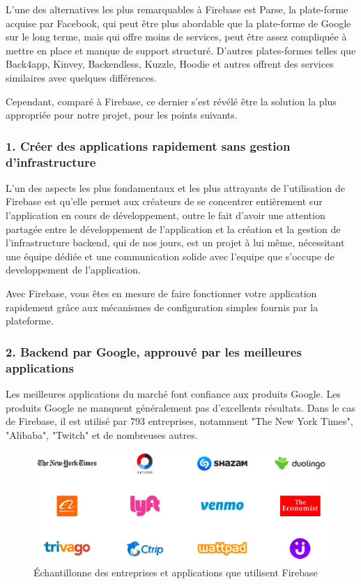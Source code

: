 L’une des alternatives les plus remarquables à Firebase est Parse, la plate-forme acquise par Facebook, qui peut être plus abordable que la plate-forme de Google sur le long terme, mais qui offre moins de services, peut être assez compliquée à mettre en place et manque de support structuré. D'autres plates-formes telles que Back4app, Kinvey, Backendless, Kuzzle, Hoodie et autres offrent des services similaires avec quelques différences.

Cependant, comparé à Firebase, ce dernier s’est révélé être la solution la plus appropriée pour notre projet, pour les points suivants.

\subsubsection{1. Créer des applications rapidement sans gestion d'infrastructure}
L’un des aspects les plus fondamentaux et les plus attrayants de l’utilisation de Firebase est qu’elle permet aux créateurs de se concentrer entièrement sur l’application en cours de développement, outre le fait d’avoir une attention partagée entre le développement de l’application et la création et la gestion de l’infrastructure backend, qui de nos jours, est un projet à lui même, nécessitant une équipe dédiée et une communication solide avec l'equipe que s'occupe de developpement de l'application.

Avec Firebase, vous êtes en mesure de faire fonctionner votre application rapidement grâce aux mécanismes de configuration simples fournis par la plateforme.

\subsubsection{2. Backend par Google, approuvé par les meilleures applications}
Les meilleures applications du marché font confiance aux produits Google. Les produits Google ne manquent généralement pas d'excellents résultats. Dans le cas de Firebase, il est utilisé par 793 entreprises\cite{noauthor_companies_nodate}, notamment "The New York Times", "Alibaba", "Twitch" et de nombreuses autres.\bigskip

\begin{figure}[h]
	\begin{center}
		\includegraphics[width=13cm]{Images/chapter2/trusting_apps.png}
		\caption{{\footnotesize Échantillonne des entreprises et applications que utilisent Firebase}}
	\end{center}
\end{figure}

